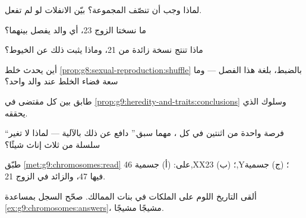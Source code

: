 \begin{exercise}[$\star$]\label{exo:g9:chromosomes:4}
لماذا وجب أن تنصّف  المجموعة؟ بيّن الانفلات لو لم
تفعل.
\end{exercise}

\begin{exercise}[$\star$]\label{exo:g9:chromosomes:5}
ما نسختا الزوج 23،  أي والد يفصل بينهما؟
\end{exercise}

\begin{exercise}[$\star$]\label{exo:g9:chromosomes:6}
ماذا تنتج نسخة زائدة من  21، وماذا يثبت ذلك عن
الخيوط؟
\end{exercise}

\begin{exercise}[$\star\star$]\label{exo:g9:chromosomes:7}
أين يحدث خلط
\cref{prop:g8:sexual-reproduction:shuffle} بالضبط، بلغة
هذا الفصل --- وما سعة فضاء الخلط عند والد واحد؟
\end{exercise}

\begin{exercise}[$\star\star$]\label{exo:g9:chromosomes:8}
طابق بين كل مقتضى في
\cref{prop:g9:heredity-and-traits:conclusions} وسلوك
 الذي يحققه.
\end{exercise}

\begin{exercise}[$\star\star$]\label{exo:g9:chromosomes:9}
``فرصة  واحدة من اثنتين في كل ، مهما سبق.''
دافع عن ذلك بالآلية --- لماذا لا تغير سلسلة من ثلاث
إناث شيئًا؟
\end{exercise}

\begin{exercise}[$\star\star$]\label{exo:g9:chromosomes:10}
طبّق \cref{met:g9:chromosomes:read} على: (أ)  جسمية
46,XX؛ (ب)  23,Y؛ (ج)  جسمية فيها 47، والزائد
في الزوج 21.
\end{exercise}

\begin{exercise}[$\star\star$]\label{exo:g9:chromosomes:11}
ألقى التاريخ اللوم على الملكات في بنات الممالك. صحّح
السجل بمساعدة \cref{ex:g9:chromosomes:answers}، مشيجًا
مشيجًا.
\end{exercise}

